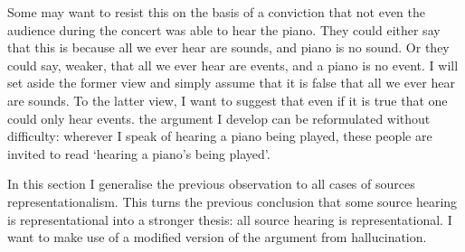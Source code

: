 \documentclass[sloppy, journal, git, bytitle, dodraft]{humapap}
\begin{document}
 
 
Some may want to resist this on the basis of a conviction that not even the audience during the concert was able to hear the piano. They could either say that this is because all we ever hear are sounds, and piano is no sound. Or they could say, weaker, that all we ever hear are events, and a piano is no event. I will set aside the former view and simply assume that it is false that all we ever hear are sounds. To the latter view, I want to suggest that even if it is true that one could only hear events. the argument I develop can be reformulated without difficulty: wherever I speak of hearing a piano being played, these people are invited to read `hearing a piano's being played'.

\sect


\sect In this section I generalise the previous observation to all cases of sources representationalism. This turns the previous conclusion that some source hearing is representational into a stronger thesis: all source hearing is representational. I want to make use of a modified version of the argument from hallucination. 
\end{document}
